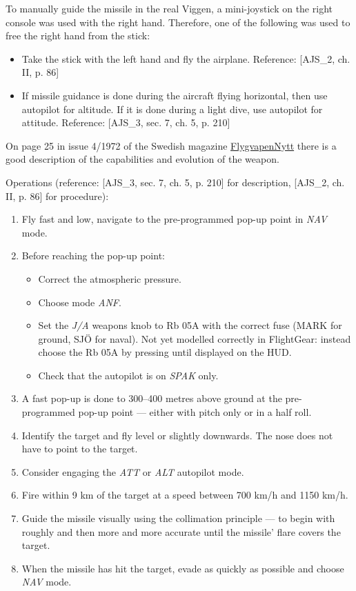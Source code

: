 {To manually guide the missile in the real Viggen, a mini-joystick on the right console was used with the right hand. Therefore, one of the following was used to free the right hand from the stick:
\begin{itemize}
 \item Take the stick with the left hand and fly the airplane. Reference: [AJS\_2, ch. II, p. 86]
 \item If missile guidance is done during the aircraft flying horizontal, then use autopilot for altitude. If it is done during a light dive, use autopilot for attitude. Reference: [AJS\_3, sec. 7, ch. 5, p. 210]
\end{itemize}

On page 25 in issue 4/1972 of the Swedish magazine \href{https://www.aef.se/Flygvapnet/Tidskrifter/FV_Nytt/Flygvapennytt_1972-4.pdf}{FlygvapenNytt} there is a good description of the capabilities and evolution of the weapon.

Operations (reference: [AJS\_3, sec. 7, ch. 5, p. 210] for description, [AJS\_2, ch. II, p. 86] for procedure):
\begin{enumerate}
 \item Fly fast and low, navigate to the pre-programmed pop-up point in \emph{NAV} mode.
 \item Before reaching the pop-up point:
 \begin{itemize}
  \item Correct the atmospheric pressure.
  \item Choose mode \emph{ANF}.
  \item Set the \emph{J/A} weapons knob to Rb 05A with the correct fuse (MARK for ground, SJÖ for naval). Not yet modelled correctly in FlightGear: instead choose the Rb 05A by pressing  until displayed on the HUD.
  \item Check that the autopilot is on \emph{SPAK} only.
 \end{itemize}
 \item A fast pop-up is done to 300--400 metres above ground at the pre-programmed pop-up point --- either with pitch only or in a half roll.
 \item Identify the target and fly level or slightly downwards. The nose does not have to point to the target. 
 \item Consider engaging the \emph{ATT} or \emph{ALT} autopilot mode.
 \item Fire within 9 km of the target at a speed between 700 km/h and 1150 km/h.
 \item Guide the missile visually using the collimation principle --- to begin with roughly and then more and more accurate until the missile' flare covers the target.
 \item When the missile has hit the target, evade as quickly as possible and choose \emph{NAV} mode.
\end{enumerate}

}

